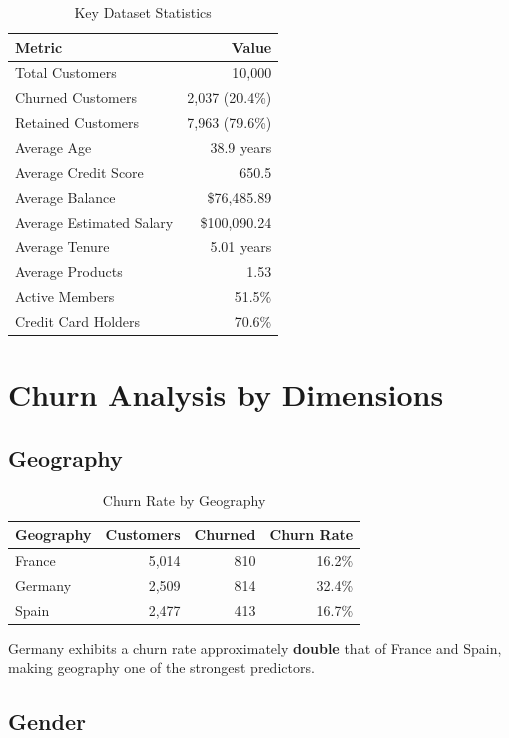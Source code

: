 \documentclass[12pt, a4paper]{report}
\begin{document}
\begin{table}[H]
\centering
\caption{Key Dataset Statistics}
\label{tab:stats}
\begin{tabular}{l r}
\toprule
\textbf{Metric} & \textbf{Value} \\
\midrule
Total Customers & 10,000 \\
Churned Customers & 2,037 (20.4\%) \\
Retained Customers & 7,963 (79.6\%) \\
Average Age & 38.9 years \\
Average Credit Score & 650.5 \\
Average Balance & \$76,485.89 \\
Average Estimated Salary & \$100,090.24 \\
Average Tenure & 5.01 years \\
Average Products & 1.53 \\
Active Members & 51.5\% \\
Credit Card Holders & 70.6\% \\
\bottomrule
\end{tabular}
\end{table}

\section{Churn Analysis by Dimensions}

\subsection{Geography}

\begin{table}[H]
\centering
\caption{Churn Rate by Geography}
\label{tab:geo_churn}
\begin{tabular}{l r r r}
\toprule
\textbf{Geography} & \textbf{Customers} & \textbf{Churned} & \textbf{Churn Rate} \\
\midrule
France & 5,014 & 810 & 16.2\% \\
Germany & 2,509 & 814 & 32.4\% \\
Spain & 2,477 & 413 & 16.7\% \\
\bottomrule
\end{tabular}
\end{table}

\noindent Germany exhibits a churn rate approximately \textbf{double} that of France and Spain, making geography one of the strongest predictors.

\subsection{Gender}
\end{document}
